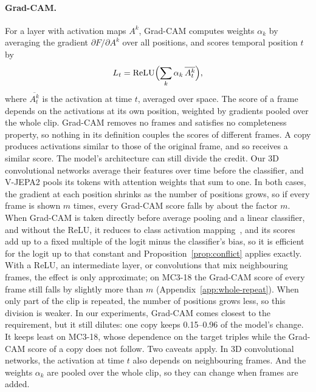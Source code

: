 \paragraph{Grad-CAM.}
For a layer with activation maps $A^k$, Grad-CAM computes weights $\alpha_k$ by averaging the gradient $\partial F / \partial A^k$ over all positions, and scores temporal position $t$ by
\begin{equation}
  L_t = \mathrm{ReLU}\Bigl( \sum_k \alpha_k\, \overline{A^k_t} \Bigr),
\end{equation}
where $\overline{A^k_t}$ is the activation at time $t$, averaged over space.
The score of a frame depends on the activations at its own position, weighted by gradients pooled over the whole clip.
Grad-CAM removes no frames and satisfies no completeness property, so nothing in its definition couples the scores of different frames.
A copy produces activations similar to those of the original frame, and so receives a similar score.
The model's architecture can still divide the credit.
Our 3D convolutional networks average their features over time before the classifier, and V-JEPA2 pools its tokens with attention weights that sum to one.
In both cases, the gradient at each position shrinks as the number of positions grows, so if every frame is shown $m$ times, every Grad-CAM score falls by about the factor $m$.
When Grad-CAM is taken directly before average pooling and a linear classifier, and without the ReLU, it reduces to class activation mapping~\citep{bolei_zhou_cam}, and its scores add up to a fixed multiple of the logit minus the classifier's bias, so it is efficient for the logit up to that constant and Proposition~\ref{prop:conflict} applies exactly.
With a ReLU, an intermediate layer, or convolutions that mix neighbouring frames, the effect is only approximate; on MC3-18 the Grad-CAM score of every frame still falls by slightly more than $m$ (Appendix~\ref{app:whole-repeat}).
When only part of the clip is repeated, the number of positions grows less, so this division is weaker.
In our experiments, Grad-CAM comes closest to the requirement, but it still dilutes: one copy keeps 0.15--0.96 of the model's change.
It keeps least on MC3-18, whose dependence on the target triples while the Grad-CAM score of a copy does not follow.
Two caveats apply.
In 3D convolutional networks, the activation at time $t$ also depends on neighbouring frames.
And the weights $\alpha_k$ are pooled over the whole clip, so they can change when frames are added.

